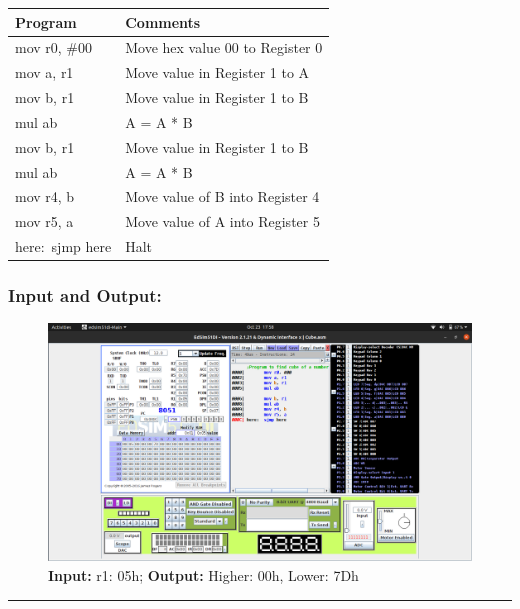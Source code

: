 \documentclass[12pt,a4paper]{article}
\begin{document}
\begin{flushleft}
\begin{table}[htb]
\centering
\begin{tabular}{|l|l|} 
\hline
\textbf{Program}                                                 & \textbf{Comments}                             \\ 
\hline
\hline
mov r0, \#00                                                     & Move hex value 00 to Register 0               \\
\hline
mov a, r1                                                        & Move value in Register 1 to A                 \\
\hline
mov b, r1                                                        & Move value in Register 1 to B                 \\
\hline  
mul ab                                                           & A = A * B                                     \\
\hline
mov b, r1                                                        & Move value in Register 1 to B                 \\
\hline
mul ab                                                           & A = A * B                                     \\
\hline
mov r4, b                                                        & Move value of B into Register 4               \\
\hline
mov r5, a                                                        & Move value of A into Register 5               \\
\hline
here:~sjmp here                                                  & Halt                                          \\
\hline
\end{tabular}
\end{table}

\subsubsection*{\textbf{Input and Output:}}
\begin{figure}[h]
    \centering
    \includegraphics[trim = 60mm 75mm 60mm 10mm, clip, width = \textwidth]{Pics/Cube.png}
    \caption{ \textbf{Input:} r1: 05h; 
              \textbf{Output:} Higher: 00h, Lower: 7Dh}
\end{figure}
\hrule

\end{flushleft}
\end{document}
